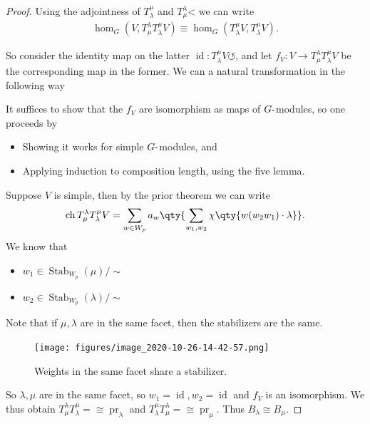 \begin{proof}

Using the adjointness of \(T_\lambda^\mu\) and
\(T_\mu^\lambda\)\textless{} we can write
\begin{align*}  
\hom_G(V, T_\mu^\lambda T_\lambda^\mu V) \equiv
\hom_G(T_\lambda^\mu V,  T_\lambda^\mu V)
.\end{align*}

So consider the identity map on the latter
\(\operatorname{id}: T_\lambda^\mu V{\circlearrowleft}\), and let
\(f_V: V\to T_\mu^\lambda T_\lambda^\mu V\) be the corresponding map in
the former. We can a natural transformation in the following way

\begin{center}
\end{center}

It suffices to show that the \(f_V\) are isomorphism as maps of
\(G{\hbox{-}}\)modules, so one proceeds by

\begin{itemize}
\item
  Showing it works for simple \(G{\hbox{-}}\)modules, and
\item
  Applying induction to composition length, using the five lemma.
\end{itemize}

Suppose \(V\) is simple, then by the prior theorem we can write
\begin{align*}  
\operatorname{ch}T_\mu^\lambda T_\lambda^\mu V = 
\sum_{w\in W_p} a_w \qty{\sum_{w_1, w_2} \chi\qty{w(w_2 w_1)\cdot \lambda } }
.\end{align*}
We know that

\begin{itemize}
\tightlist
\item
  \(w_1\in {\operatorname{Stab}}_{W_p}(\mu) / \sim\)
\item
  \(w_2\in {\operatorname{Stab}}_{W_p}(\lambda) / \sim\)
\end{itemize}

Note that if \(\mu, \lambda\) are in the same facet, then the
stabilizers are the same.

\begin{figure}
\centering
\texttt{[image: figures/image\_2020-10-26-14-42-57.png]}
\caption{Weights in the same facet share a stabilizer.}
\end{figure}

So \(\lambda, \mu\) are in the same facet, so
\(w_1 = \operatorname{id}, w_2 = \operatorname{id}\) and \(f_V\) is an
isomorphism. We thus obtain
\(T_\mu^\lambda T_\lambda^\mu =\cong {\operatorname{pr}}_\lambda\) and
\(T_\lambda^\mu T_\mu^\lambda =\cong {\operatorname{pr}}_\mu\). Thus
\(B_\lambda \cong B_\mu\).

\end{proof}

